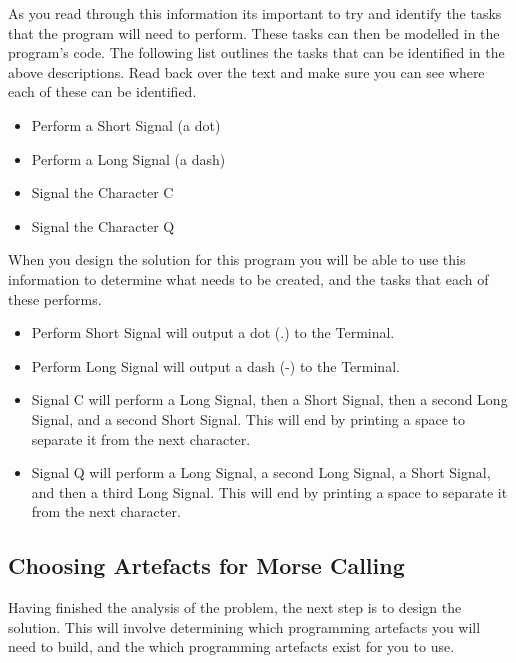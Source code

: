 As you read through this information its important to try and identify the tasks that the program will need to perform. These tasks can then be modelled in the program's code. The following list outlines the tasks that can be identified in the above descriptions. Read back over the text and make sure you can see where each of these can be identified.

\begin{itemize}
  \item Perform a Short Signal (a dot)
  \item Perform a Long Signal (a dash)
  \item Signal the Character C
  \item Signal the Character Q
\end{itemize}

When you design the solution for this program you will be able to use this information to determine what needs to be created, and the tasks that each of these performs.

\begin{itemize}
  \item Perform Short Signal will output a dot (.) to the Terminal.
  \item Perform Long Signal will output a dash (-) to the Terminal.
  \item Signal C will perform a Long Signal, then a Short Signal, then a second Long Signal, and a second Short Signal. This will end by printing a space to separate it from the next character.
  \item Signal Q will perform a Long Signal, a second Long Signal, a Short Signal, and then a third Long Signal. This will end by printing a space to separate it from the next character.
\end{itemize}

\clearpage
\subsection{Choosing Artefacts for Morse Calling} %
\label{sub:procedure-decl-choosing_artefacts}

Having finished the analysis of the problem, the next step is to design the solution. This will involve determining which programming artefacts you will need to build, and the which programming artefacts exist for you to use. 

